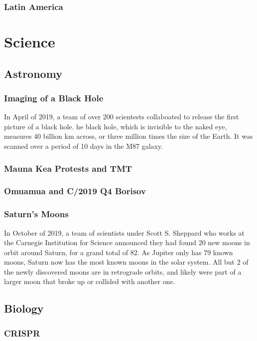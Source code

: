 			\subsubsection{Latin America}
	\section{Science}
		\subsection{Astronomy}
			\subsubsection{Imaging of a Black Hole}
			In April of 2019, a team of over 200 scientests collaboated to release the first picture of a black hole.  he black hole, which is invisible to the naked eye, measures 40 billion km across, or three million times the size of the Earth.  It was scanned over a period of 10 days in the M87 galaxy.  
			
			\subsubsection{Mauna Kea Protests and TMT}
			
			
			\subsubsection{Omuamua and C/2019 Q4 Borisov}
			
			
			\subsubsection{Saturn's Moons}
				In October of 2019, a team of scientists under Scott S. Sheppard who works at the Carnegie Institution for Science announced they had found 20 new moons in orbit around Saturn, for a grand total of 82. As Jupiter only has 79 known moons, Saturn now has the most known moons in the solar system.  All but 2 of the newly discovered moons are in retrograde orbits, and likely were part of a larger moon that broke up or collided with another one. 
		\subsection{Biology}
			\subsubsection{CRISPR}
		
